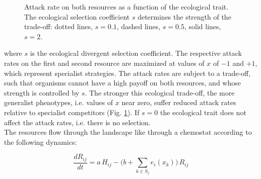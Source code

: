\begin{figure}
    \begin{center}
        \end{center}
    \label{fig:attack_rates}
    \caption{Attack rate on both resources as a function of the ecological trait. The ecological selection coefficient $s$ determines the strength of the trade-off: dotted lines, $s = 0.1$, dashed lines, $s = 0.5$, solid lines, $s = 2$.}
\end{figure}

where $s$ is the ecological divergent selection coefficient. The respective attack rates on the first and second resource are maximized at values of $x$ of $-1$ and $+1$, which represent specialist strategies. The attack rates are subject to a trade-off, such that organisms cannot have a high payoff on both resources, and whose strength is controlled by $s$. The stronger this ecological trade-off, the more generalist phenotypes, i.e. values of $x$ near zero, suffer reduced attack rates relative to specialist competitors (Fig. \ref{fig:attack_rates}). If $s = 0$ the ecological trait does not affect the attack rates, i.e. there is no selection.\\

The resources flow through the landscape like through a chemostat according to the following dynamics:

\begin{equation}
    \frac{dR_{ij}}{dt} = a \, H_{ij} - \big(b + \sum_{k \in S_j} e_i(x_k) \big) \, R_{ij}
    \label{eq:resource_dynamics}
\end{equation}

